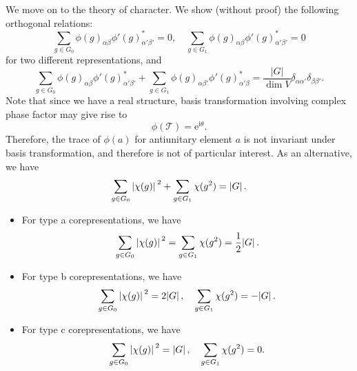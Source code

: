 \documentclass[hyperref, a4paper]{article}
\newcommand*{\ii}{\mathrm{i}}
\newcommand*{\ee}{\mathrm{e}}
\begin{document}
We move on to the theory of character. We show (without proof) the following orthogonal relations:
\begin{equation}
    \sum_{g \in G_0} \phi(g)_{\alpha \beta} \phi'(g)^*_{\alpha' \beta'} = 0, \quad \sum_{g \in G_1} \phi(g)_{\alpha \beta} \phi'(g)^*_{\alpha' \beta'} = 0
\end{equation}
for two different representations, and 
\begin{equation}
    \sum_{g \in G_0} \phi(g)_{\alpha \beta} \phi'(g)^*_{\alpha' \beta'} + \sum_{g \in G_1} \phi(g)_{\alpha \beta'} \phi'(g)^*_{\alpha' \beta} = \frac{|G|}{\dim V} \delta_{\alpha \alpha'} \delta_{\beta \beta'}.
\end{equation}
Note that since we have a real structure, basis transformation involving complex phase factor may give rise to %
\begin{equation}
    \phi(\mathcal{T}) = \ee^{\ii \theta}.
\end{equation}
Therefore, the trace of $\phi(a)$ for antiunitary element $a$ is not invariant under basis transformation, and
therefore is not of particular interest. As an alternative, we have 
\begin{equation}
    \sum_{g \in G_0} \abs*{\chi(g)}^2 + \sum_{g \in G_1} \chi(g^2) = \abs*{G}.
\end{equation}
\begin{itemize}
    \item For type a corepresentations, we have 
    \begin{equation}
        \sum_{g \in G_0} \abs*{\chi(g)}^2 = \sum_{g \in G_1} \chi(g^2) = \frac{1}{2} \abs*{G}.
    \end{equation}
    \item For type b corepresentations, we have 
    \begin{equation}
        \sum_{g \in G_0} \abs*{\chi(g)}^2 = 2\abs*{G}, \quad \sum_{g \in G_1} \chi(g^2) = - \abs*{G}.
    \end{equation}
    \item For type c corepresentations, we have 
    \begin{equation}
        \sum_{g \in G_0} \abs*{\chi(g)}^2 = \abs*{G}, \quad \sum_{g \in G_1} \chi(g^2) = 0.
    \end{equation}
\end{itemize}
\end{document}
